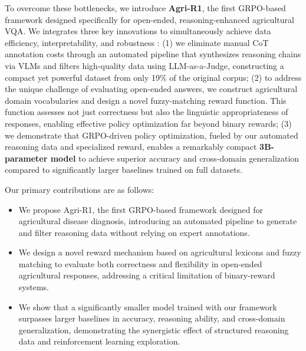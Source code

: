 \documentclass[11pt]{article}
\begin{document}

To overcome these bottlenecks, we introduce \textbf{Agri-R1}, the first GRPO-based framework designed specifically for open-ended, reasoning-enhanced agricultural VQA. We integrates three key innovations to simultaneously achieve data efficiency, interpretability, and robustness
: (1) we eliminate manual CoT annotation costs through an automated pipeline that synthesizes reasoning chains via VLMs and filters high-quality data using LLM-as-a-Judge, constructing a compact yet powerful dataset from only 19\% of the original corpus; (2) to address the unique challenge of evaluating open-ended answers, we construct agricultural domain vocabularies and design a novel fuzzy-matching reward function. This function assesses not just correctness but also the linguistic appropriateness of responses, enabling effective policy optimization far beyond binary rewards; (3) we demonstrate that GRPO-driven policy optimization, fueled by our automated reasoning data and specialized reward, enables a remarkably compact \textbf{3B-parameter model} to achieve superior accuracy and cross-domain generalization compared to significantly larger baselines trained on full datasets.

Our primary contributions are as follows:
\begin{itemize}
    \item We propose Agri-R1, the first GRPO-based framework designed for agricultural disease diagnosis, introducing an automated pipeline to generate and filter reasoning data without relying on expert annotations.
    \item We design a novel reward mechanism based on agricultural lexicons and fuzzy matching to evaluate both correctness and flexibility in open-ended agricultural responses, addressing a critical limitation of binary-reward systems.
    \item We show that a significantly smaller model trained with our framework surpasses larger baselines in accuracy, reasoning ability, and cross-domain generalization, demonstrating the synergistic effect of structured reasoning data and reinforcement learning exploration.
\end{itemize}
\end{document}
